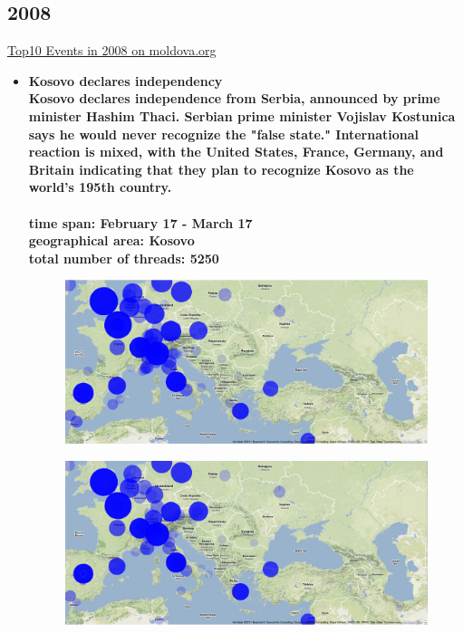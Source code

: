 \documentclass[11pt,a4paper,english]{article}
\begin{document}
			\subsection{2008}
			\href{http://social.moldova.org/news/10-most-important-world-events-of-2008-217389-eng.html}{Top10 Events in 2008 on moldova.org}
				\begin{itemize}
					\item \bf Kosovo declares independency \rm
						\\ Kosovo declares independence from Serbia, announced by prime minister Hashim Thaci. Serbian prime minister Vojislav Kostunica says he would never recognize the "false state." International reaction is mixed, with the United States, France, Germany, and Britain indicating that they plan to recognize Kosovo as the world's 195th country.
						\\\\ \bf time span: \rm February 17 - March 17
						\\ \bf geographical area: \rm Kosovo
						\\ \bf total number of threads: \rm 5250
						\begin{figure}[H]
							\vspace{-5pt}
  							\begin{center}
								\includegraphics[width=130mm]{img/pre-kosovo}
							\end{center}
							\vspace{-13pt}
						\end{figure}
						\begin{figure}[H]
							\vspace{-13pt}
	  						\begin{center}
								\includegraphics[width=130mm]{img/post-kosovo}

\end{center}
\end{figure}
\end{itemize}
\end{document}

